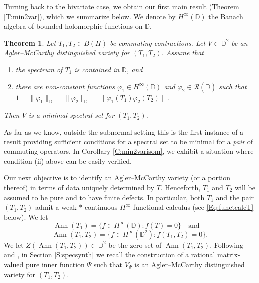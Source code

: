 \documentclass[10pt]{amsart}
\newcommand{\bD}{{\mathbb{D}}}
\newcommand{\R}{{\mathcal{R}}}
\renewcommand{\phi}{\varphi}
\newcommand{\ol}{\overline}
\newcommand{\qand}{\quad\text{and}\quad}
\newcommand{\Ann}{\operatorname{Ann}}
\newtheorem{theoremx}{Theorem}
\theoremstyle{definition}
\begin{document}
Turning back to the bivariate case, we obtain our first main result (Theorem \ref{T:min2var}), which we summarize below.  We denote by $H^\infty(\bD)$ the Banach algebra of bounded holomorphic functions on $\bD$.

\begin{theoremx}\label{T:A}
Let $T_1,T_2\in B(H)$ be commuting contractions. Let $V\subset \bD^2$ be an Agler--McCarthy distinguished variety for $(T_1,T_2)$. 
Assume that
\begin{enumerate}[{\rm (i)}]
\item the spectrum of $T_1$ is contained in $\bD$, and
\item there are non-constant functions $\phi_1\in H^\infty(\bD)$ and $\phi_2\in \R(\ol{\bD})$ such that $1=\|\phi_1\|_{\bD}=\|\phi_2\|_{\bD}=\|\phi_1(T_1)\phi_2(T_2)\|$.
\end{enumerate}
Then $\ol{V}$ is a minimal spectral set for $(T_1,T_2)$.
\end{theoremx}

As far as we know, outside the subnormal setting this is the first instance of a result providing sufficient conditions for a spectral set to be minimal for a \emph{pair} of commuting operators. In Corollary \ref{C:min2varisom}, we exhibit a situation where condition (ii) above can be easily verified.

Our next objective is to identify an Agler--McCarthy  variety (or a portion thereof) in terms of data uniquely determined by $T$. Henceforth, $T_1$ and $T_2$ will be assumed to be pure and to have finite defects. 
In particular, both $T_1$ and the pair $(T_1,T_2)$ admit a weak-$*$ continuous $H^\infty$-functional calculus (see \eqref{Eq:functcalcT} below). We let
\[
\Ann(T_1)=\{f\in H^\infty(\bD):f(T)=0\} \qand
\]
\[
\Ann(T_1,T_2)=\{f\in H^\infty(\bD^2):f(T_1,T_2)=0\}.
\]
We let $Z(\Ann(T_1,T_2))\subset \bD^2$ be the zero set of $\Ann(T_1,T_2)$. Following \cite{AM2005} and \cite{DS2017}, in Section \ref{S:specsynth} we recall the construction of a rational matrix-valued pure inner function $\Psi$ such that $V_\Psi$ is an Agler--McCarthy distinguished variety for $(T_1,T_2)$.
\end{document}
